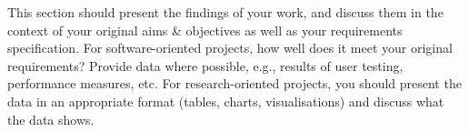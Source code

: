 This section should present the findings of your work, and discuss them in the context of your original aims \& objectives as well as your requirements specification. For software-oriented projects, how well does it meet your original requirements? Provide data where possible, e.g., results of user testing, performance measures, etc. For research-oriented projects, you should present the data in an appropriate format (tables, charts, visualisations) and discuss what the data shows.